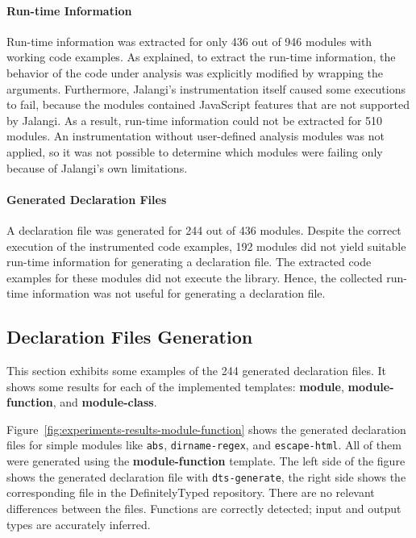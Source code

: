 \documentclass[english,cleveref,autoref,submission]{programming}
\newcommand{\figref}[1]{Figure~\ref{#1}}
\begin{document}
\paragraph*{Run-time Information}
Run-time information was extracted for only 436 out of 946 modules with working code
examples. As explained, to extract the run-time information, the behavior of the code
under analysis was explicitly modified by wrapping the arguments. Furthermore, Jalangi’s
instrumentation itself caused some executions to fail, because the modules contained
JavaScript features that are not supported by Jalangi. As a result, run-time information
could not be extracted for 510 modules. An instrumentation without user-defined analysis
modules was not applied, so it was not possible to determine which modules were failing
only because of Jalangi’s own limitations. 

\paragraph*{Generated Declaration Files}
A declaration file was generated for 244 out of 436 modules. Despite the correct execution
of the instrumented code examples, 192 modules did not yield suitable run-time information
for generating a declaration file. The extracted code examples for these modules did not
execute the library. Hence, the collected run-time information was not useful
for generating a declaration file. 

\subsection{Declaration Files Generation}
\label{sec:experiments-declaration-files-generation}


This section exhibits some examples of the 244 generated
declaration files. It shows some results for each of the implemented
templates: \textbf{module}, \textbf{module-function}, and
\textbf{module-class}. 

\figref{fig:experiments-results-module-function} shows the generated
declaration files for simple modules like \texttt{abs},
\texttt{dirname-regex}, and \texttt{escape-html}. All of them were
generated using the \textbf{module-function} template. The left side of the figure shows
the generated declaration file with 
\lstinline{dts-generate}, the right side shows the corresponding file
in the DefinitelyTyped repository. There are no relevant
differences between the files. Functions are correctly detected; input and output types are accurately inferred.
\end{document}
